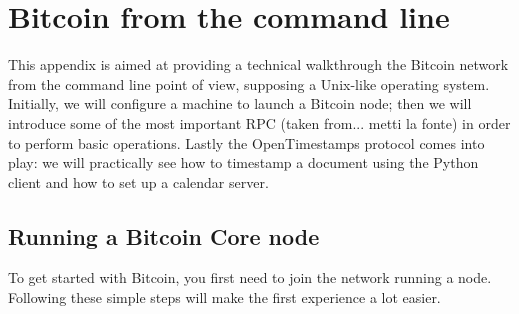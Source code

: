 \chapter{Bitcoin from the command line}
\label{app:A}
This appendix is aimed at providing a technical walkthrough the Bitcoin network from the command line point of view, supposing a Unix-like operating system. Initially, we will configure a machine to launch a Bitcoin node; then we will introduce some of the most important RPC (taken from... metti la fonte) in order to perform basic operations. Lastly the OpenTimestamps protocol comes into play: we will practically see how to timestamp a document using the Python client and how to set up a calendar server.
\bigskip

\section{Running a Bitcoin Core node}
To get started with Bitcoin, you first need to join the network running a node. Following these simple steps will make the first experience a lot easier.
